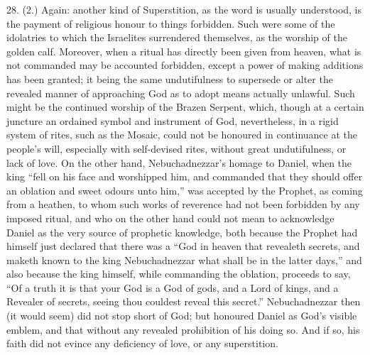 28. (2.) Again: another kind of Superstition, as the word is
usually understood, is the payment of religious honour to things
forbidden. Such were some of the idolatries to which the Israelites
surrendered themselves, as the worship of the golden calf. Moreover,
when a ritual has directly been given from heaven, what is not
commanded may be accounted forbidden, except a power of making
additions has been granted; it being the same undutifulness to
supersede or alter the revealed manner of approaching God as to adopt
means actually unlawful. Such might be the continued worship of the
Brazen Serpent, which, though at a certain juncture an ordained symbol
and instrument of God, nevertheless, in a rigid system of rites, such
as the Mosaic, could not be honoured in continuance at the people's
will, especially with self-devised rites, without great undutifulness,
or lack of love. On the other hand, Nebuchadnezzar's homage to Daniel,
when the king ``fell on his face and worshipped him, and commanded
that they should offer an oblation and sweet odours unto him,''
was accepted by the Prophet, as coming from a heathen, to whom such
works of reverence had not been forbidden by any imposed ritual, and
who on the other hand could not mean to acknowledge Daniel as the very
source of prophetic knowledge, both because the Prophet had himself
just declared that there was a ``God in heaven that revealeth
secrets, and maketh known to the king Nebuchadnezzar what shall be in
the latter days,'' and also because the king himself, while
commanding the oblation, proceeds to say, ``Of a truth it is that
your God is a God of gods, and a Lord of kings, and a Revealer of
secrets, seeing thou couldest reveal this secret.'' Nebuchadnezzar
then (it would seem) did not stop short of God; but honoured Daniel as
God's visible emblem, and that without any revealed prohibition of his
doing so. And if so, his faith did not evince any deficiency of love,
or any superstition.

